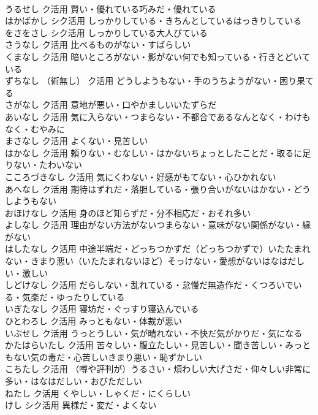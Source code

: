 \documentclass[8pt]{extreport}
\begin{document}
\begin{CJK}{UTF8}{min}
\\	うるせし		ク活用	賢い・優れている巧みだ・優れている
\\	はかばかし		シク活用	しっかりしている・きちんとしているはっきりしている
\\	をさをさし		シク活用	しっかりしている大人びている
\\	さうなし		ク活用	比べるものがない・すばらしい
\\	くまなし		ク活用	暗いところがない・影がない何でも知っている・行きとどいている
\\	ずちなし	（術無し）	ク活用	どうしようもない・手のうちようがない・困り果てる
\\	さがなし		ク活用	意地が悪い・口やかましいいたずらだ
\\	あいなし		ク活用	気に入らない・つまらない・不都合であるなんとなく・わけもなく・むやみに
\\	まさなし		ク活用	よくない・見苦しい
\\	はかなし		ク活用	頼りない・むなしい・はかないちょっとしたことだ・取るに足りない・たわいない
\\	こころづきなし		ク活用	気にくわない・好感がもてない・心ひかれない
\\	あへなし		ク活用	期待はずれだ・落胆している・張り合いがないはかない・どうしようもない
\\	おほけなし		ク活用	身のほど知らずだ・分不相応だ・おそれ多い
\\	よしなし		ク活用	理由がない方法がないつまらない・意味がない関係がない・縁がない
\\	はしたなし		ク活用	中途半端だ・どっちつかずだ（どっちつかずで）いたたまれない・きまり悪い（いたたまれないほど）そっけない・愛想がないはなはだしい・激しい
\\	しどけなし		ク活用	だらしない・乱れている・怠慢だ無造作だ・くつろいでいる・気楽だ・ゆったりしている
\\	いぎたなし		ク活用	寝坊だ・ぐっすり寝込んでいる
\\	ひとわろし		ク活用	みっともない・体裁が悪い
\\	いぶせし		ク活用	うっとうしい・気が晴れない・不快だ気がかりだ・気になる
\\	かたはらいたし		ク活用	苦々しい・腹立たしい・見苦しい・聞き苦しい・みっともない気の毒だ・心苦しいきまり悪い・恥ずかしい
\\	こちたし		ク活用	（噂や評判が）うるさい・煩わしい大げさだ・仰々しい非常に多い・はなはだしい・おびただしい
\\	ねたし		ク活用	くやしい・しゃくだ・にくらしい
\\	けし		シク活用	異様だ・変だ・よくない

\end{CJK}
\end{document}
